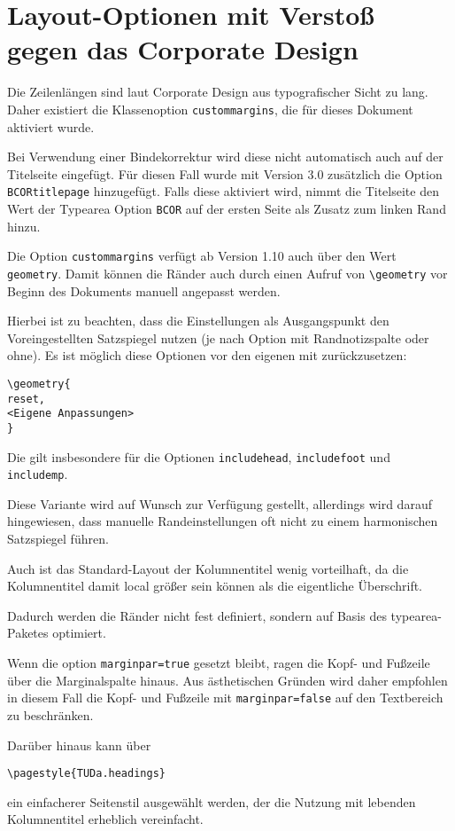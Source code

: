 \documentclass[
	ngerman,
	ruledheaders=chapter,%
	class=book,%
	thesis={
		type=dr,
		dr=rernat
	},
	accentcolor=9c,%
	custommargins=true,%
	marginpar=false,%
	fontsize=11pt,%
]{tudapub}
\let\code\texttt
\let\tbs\textbackslash
\begin{document}
\section{Layout-Optionen mit Verstoß gegen das Corporate Design}
Die Zeilenlängen sind laut Corporate Design aus typografischer Sicht zu lang.
Daher existiert die Klassenoption \code{custommargins}, die für dieses Dokument aktiviert wurde.

Bei Verwendung einer Bindekorrektur wird diese nicht automatisch auch auf der Titelseite eingefügt. Für diesen Fall wurde mit Version 3.0 zusätzlich die Option \code{BCORtitlepage} hinzugefügt. Falls diese aktiviert wird, nimmt die Titelseite den Wert der Typearea Option \code{BCOR} auf der ersten Seite als Zusatz zum linken Rand hinzu.

Die Option \code{custommargins} verfügt ab Version 1.10 auch über den Wert \code{geometry}. Damit können die Ränder auch durch einen Aufruf von \code{\tbs{}geometry} vor Beginn des Dokuments manuell angepasst werden.

Hierbei ist zu beachten, dass die Einstellungen als Ausgangspunkt den Voreingestellten Satzspiegel nutzen (je nach Option mit Randnotizspalte oder ohne). Es ist möglich diese Optionen vor den eigenen mit zurückzusetzen:
\begin{verbatim}
\geometry{
reset,
<Eigene Anpassungen>
}
\end{verbatim}
Die gilt insbesondere für die Optionen \code{includehead}, \code{includefoot} und \code{includemp}.

Diese Variante wird auf Wunsch zur Verfügung gestellt, allerdings wird darauf hingewiesen, dass manuelle Randeinstellungen oft nicht zu einem harmonischen Satzspiegel führen.

Auch ist das Standard-Layout der Kolumnentitel wenig vorteilhaft, da die Kolumnentitel damit local größer sein können als die eigentliche Überschrift.


Dadurch werden die Ränder nicht fest definiert, sondern auf Basis des typearea-Paketes optimiert.

Wenn die option \code{marginpar=true} gesetzt bleibt, ragen die Kopf- und Fußzeile über die Marginalspalte hinaus. Aus ästhetischen Gründen wird daher empfohlen in diesem Fall die Kopf- und Fußzeile  mit \code{marginpar=false}  auf den Textbereich zu beschränken.


Darüber hinaus kann über
\begin{verbatim}
\pagestyle{TUDa.headings}
\end{verbatim}
ein einfacherer Seitenstil ausgewählt werden, der die Nutzung mit lebenden Kolumnentitel erheblich vereinfacht.
\end{document}
